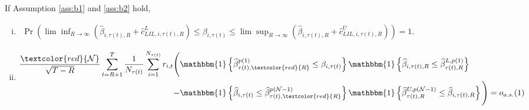 \begin{proposition}
\label{prop:trimerror}
If Assumption \ref{ass:b1} and \ref{ass:b2} hold,
\begin{enumerate}[(i)]
\item 
$\begin{aligned}
    \Pr \left( \lim \inf_{R \rightarrow \infty} \left( \widehat{\beta}_{i,\tau(t),R} + \widehat{c}^L_{LIL,i,\tau(t),R} \right) \leq \beta_{i,\tau(t)} \leq \lim \sup_{R \rightarrow \infty} \left( \widehat{\beta}_{i,\tau(t),R} + \widehat{c}^U_{LIL,i,\tau(t),R} \right) \right) = 1.
\end{aligned}$ 
\item
$\begin{aligned}
    \frac{\textcolor{red}{\mathcal{N}}}{\sqrt{T - R}} \sum_{t=R+1}^{T} \frac{1}{N_{\tau(t)}} \sum_{i=1}^{N_{\tau(t)}} r_{i,t} \Bigg( & \mathbbm{1} \left\{ \widehat{\beta}_{\tau(t),\textcolor{red}{R}}^{p(1)} \leq \beta_{i,\tau(t)} \right\} \mathbbm{1} \left\{ \widehat{\beta}_{i,\tau(t),R} \leq \widehat{\beta}_{\tau(t),R}^{L,p(1)} \right\} \\
    - & \mathbbm{1} \left\{ \widehat{\beta}_{i,\tau(t)} \leq \widehat{\beta}_{\tau(t),\textcolor{red}{R}}^{p(\mathcal{N}-1)} \right\}\mathbbm{1} \left\{ \widehat{\beta}_{\tau(t),R}^{U,p(\mathcal{N}-1)} \leq \widehat{\beta}_{i,\tau(t),R} \right\} \Bigg) = o_{a.s.}(1) \notag
\end{aligned}$ 
\end{enumerate}
\end{proposition}

